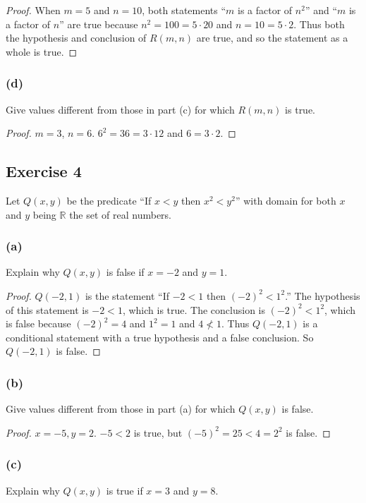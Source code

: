 \documentclass[14pt]{extarticle}
\newcommand{\R}{\mathbb{R}}
\begin{document}
\begin{proof}
When $m = 5$ and $n = 10$, both statements “$m$ is a factor of $n^2$” and “$m$ is a factor of $n$” are true because $n^2 = 100 = 5 \cdot 20$ and $n = 10 = 5 \cdot 2$. Thus both the hypothesis and conclusion of $R(m, n)$ are true, and so the statement as a whole is true.
\end{proof}

\subsubsection{(d)}
Give values different from those in part (c) for which $R(m, n)$ is true.

\begin{proof}
$m = 3$, $n = 6$. $6^2 = 36 = 3 \cdot 12$ and $6 = 3 \cdot 2$.
\end{proof}

\subsection{Exercise 4}
Let $Q(x, y)$ be the predicate “If $x < y$ then $x^2 < y^2$” with domain for both $x$ and $y$ being $\R$ the set of real numbers.

\subsubsection{(a)}
Explain why $Q(x, y)$ is false if $x = -2$ and $y = 1$.

\begin{proof}
$Q(-2, 1)$ is the statement “If $-2 < 1$ then $(-2)^2 < 1^2$.” The hypothesis of this statement is $-2 < 1$, which is true. The conclusion is $(-2)^2 < 1^2$, which is false because $(-2)^2 = 4$ and $1^2 = 1$ and $4 \nless 1$. Thus $Q(-2, 1)$ is a conditional statement with a true hypothesis and a false conclusion. So $Q(-2, 1)$ is false.

\end{proof}

\subsubsection{(b)}
Give values different from those in part (a) for which $Q(x, y)$ is false.

\begin{proof}
$x = -5, y = 2$. $-5 < 2$ is true, but $(-5)^2 = 25 < 4 = 2^2$ is false.
\end{proof}

\subsubsection{(c)}
Explain why $Q(x, y)$ is true if $x = 3$ and $y = 8$.
\end{document}
